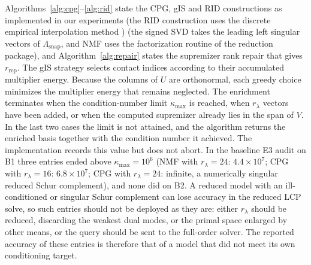 \documentclass[11pt,a4paper]{article}
\begin{document}
Algorithms~\ref{alg:cpg}--\ref{alg:rid} state the CPG, gIS and RID constructions as implemented in our experiments (the RID construction uses the discrete empirical interpolation method \cite{chaturantabut2010nonlinear}) (the signed SVD takes the leading left singular vectors of \(\Lambda_{\mathrm{snap}}\), and NMF uses the factorization routine of the reduction package), and Algorithm~\ref{alg:repair} states the supremizer rank repair that gives \(r_{\mathrm{rep}}\). The gIS strategy selects contact indices according to their accumulated multiplier energy. Because the columns of \(U\) are orthonormal, each greedy choice minimizes the multiplier energy that remains neglected. The enrichment terminates when the condition-number limit \(\kappa_{\max}\) is reached, when \(r_\lambda\) vectors have been added, or when the computed supremizer already lies in the span of \(V\). In the last two cases the limit is not attained, and the algorithm returns the enriched basis together with the condition number it achieved. The implementation records this value but does not abort. In the baseline E3 audit on B1 three entries ended above \(\kappa_{\max} = 10^{6}\) (NMF with \(r_\lambda = 24\): \(4.4\times10^{7}\); CPG with \(r_\lambda = 16\): \(6.8\times10^{7}\); CPG with \(r_\lambda = 24\): infinite, a numerically singular reduced Schur complement), and none did on B2. A reduced model with an ill-conditioned or singular Schur complement can lose accuracy in the reduced LCP solve, so such entries should not be deployed as they are: either \(r_\lambda\) should be reduced, discarding the weakest dual modes, or the primal space enlarged by other means, or the query should be sent to the full-order solver. The reported accuracy of these entries is therefore that of a model that did not meet its own conditioning target.
\end{document}
